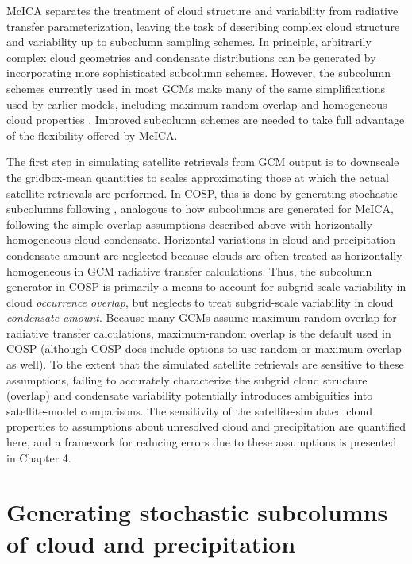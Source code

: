 McICA separates the treatment of cloud structure and variability from
radiative transfer parameterization, leaving the task of describing
complex cloud structure and variability up to subcolumn sampling
schemes. In principle, arbitrarily complex cloud geometries and
condensate distributions can be generated by incorporating more
sophisticated subcolumn schemes. However, the subcolumn schemes
currently used in most GCMs make many of the same simplifications used
by earlier models, including maximum-random overlap and homogeneous
cloud properties \citep[e.g.,][]{neale_et_al_2010a, neale_et_al_2010b}.
Improved subcolumn schemes are needed to take full advantage of the
flexibility offered by McICA.

The first step in simulating satellite retrievals from GCM output is to
downscale the gridbox-mean quantities to scales approximating those at
which the actual satellite retrievals are performed. In COSP, this is
done by generating stochastic subcolumns following
\citet{klein_and_jakob_1999}, analogous to how subcolumns are generated
for McICA, following the simple overlap assumptions described above with
horizontally homogeneous cloud condensate. Horizontal variations in
cloud and precipitation condensate amount are neglected because clouds
are often treated as horizontally homogeneous in GCM radiative transfer
calculations. Thus, the subcolumn generator in COSP is primarily a means
to account for subgrid-scale variability in cloud \emph{occurrence
overlap}, but neglects to treat subgrid-scale variability in cloud
\emph{condensate amount}. Because many GCMs assume maximum-random
overlap for radiative transfer calculations, maximum-random overlap is
the default used in COSP (although COSP does include options to use
random or maximum overlap as well). To the extent that the simulated
satellite retrievals are sensitive to these assumptions, failing to
accurately characterize the subgrid cloud structure (overlap) and
condensate variability potentially introduces ambiguities into
satellite-model comparisons. The sensitivity of the satellite-simulated
cloud properties to assumptions about unresolved cloud and precipitation
are quantified here, and a framework for reducing errors due to these
assumptions is presented in Chapter 4.

\section{Generating stochastic subcolumns of cloud and
precipitation}\label{sec:subgrid1Scops}

